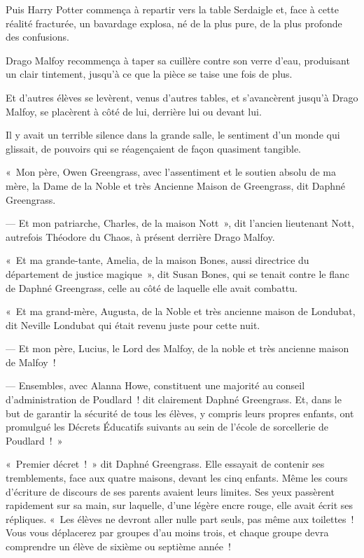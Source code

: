 Puis Harry Potter commença à repartir vers la table Serdaigle et, face à cette réalité fracturée, un bavardage explosa, né de la plus pure, de la plus profonde des confusions.

Drago Malfoy recommença à taper sa cuillère contre son verre d'eau, produisant un clair tintement, jusqu'à ce que la pièce se taise une fois de plus.

Et d'autres élèves se levèrent, venus d'autres tables, et s'avancèrent jusqu'à Drago Malfoy, se placèrent à côté de lui, derrière lui ou devant lui.

Il y avait un terrible silence dans la grande salle, le sentiment d'un monde qui glissait, de pouvoirs qui se réagençaient de façon quasiment tangible.

«~Mon père, Owen Greengrass, avec l'assentiment et le soutien absolu de ma mère, la Dame de la Noble et très Ancienne Maison de Greengrass, dit Daphné Greengrass.

--- Et mon patriarche, Charles, de la maison Nott~», dit l'ancien lieutenant Nott, autrefois Théodore du Chaos, à présent derrière Drago Malfoy.

«~Et ma grande-tante, Amelia, de la maison Bones, aussi directrice du département de justice magique~», dit Susan Bones, qui se tenait contre le flanc de Daphné Greengrass, celle au côté de laquelle elle avait combattu.

«~Et ma grand-mère, Augusta, de la Noble et très ancienne maison de Londubat, dit Neville Londubat qui était revenu juste pour cette nuit.

--- Et mon père, Lucius, le Lord des Malfoy, de la noble et très ancienne maison de Malfoy~!

--- Ensembles, avec Alanna Howe, constituent une majorité au conseil d'administration de Poudlard~! dit clairement Daphné Greengrass.
Et, dans le but de garantir la sécurité de tous les élèves, y compris leurs propres enfants, ont promulgué les Décrets Éducatifs suivants au sein de l'école de sorcellerie de Poudlard~!~»

\later

«~Premier décret~!~»
dit Daphné Greengrass.
Elle essayait de contenir ses tremblements, face aux quatre maisons, devant les cinq enfants.
Même les cours d'écriture de discours de ses parents avaient leurs limites.
Ses yeux passèrent rapidement sur sa main, sur laquelle, d'une légère encre rouge, elle avait écrit ses répliques.
«~Les élèves ne devront aller nulle part seuls, pas même aux toilettes~!
Vous vous déplacerez par groupes d'au moins trois, et chaque groupe devra comprendre un élève de sixième ou septième année~!

